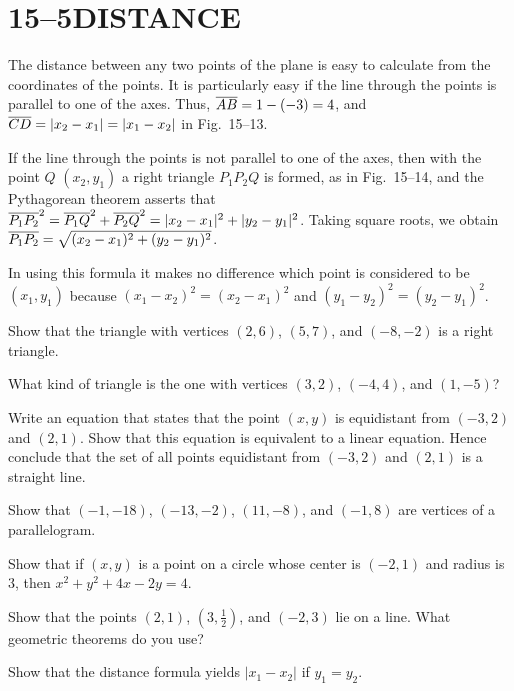 \documentclass[11pt]{book}
\theoremstyle{bkplain}
\begin{document}
\section*{15--5\quad DISTANCE}

The distance between any two points of the plane is easy to calculate from the
coordinates of the points. It is particularly easy if the line through the
points is parallel to one of the axes. Thus, $\overline{AB} = 1 - (-3) = 4$, and
$\overline{CD} = |x_2 - x_1| = |x_1 - x_2|$ in Fig.~15--13.

\FIGXVTHIRTEENFOURTEEN

If the line through the points is not parallel to one of the axes, then with
the point $Q$ $(x_2, y_1)$ a right triangle $P_1P_2Q$ is formed, as in
Fig.~15--14, and the Pythagorean theorem asserts that
$\overline{P_1P_2}^2 = \overline{P_1Q}^2 + \overline{P_2Q}^2 = |x_2 - x_1|^2 +
|y_2 - y_1|^2$. Taking square roots, we obtain
$\overline{P_1P_2} = \sqrt{(x_2-x_1)^2 + (y_2-y_1)^2}$.

\begin{remark}
In using this formula it makes no difference which point is considered to be
$(x_1, y_1)$ because $(x_1 - x_2)^2 = (x_2 - x_1)^2$ and
$(y_1 - y_2)^2 = (y_2 - y_1)^2$.
\end{remark}

\begin{exercisecols}
\begin{exlist}
\item Show that the triangle with vertices $(2, 6)$, $(5, 7)$, and
  $(-8, -2)$ is a right triangle.
\item What kind of triangle is the one with vertices $(3, 2)$, $(-4, 4)$, and
  $(1, -5)$?
\item[\stex 3.] Write an equation that states that the point $(x, y)$ is
  equidistant from $(-3, 2)$ and $(2, 1)$. Show that this equation is
  equivalent to a linear equation. Hence conclude that the set of all points
  equidistant from $(-3, 2)$ and $(2, 1)$ is a straight line.
\item[4.] Show that $(-1, -18)$, $(-13, -2)$, $(11, -8)$, and $(-1, 8)$ are
  vertices of a parallelogram.
\setcounter{exlisti}{4}
\item Show that if $(x, y)$ is a point on a circle whose center is $(-2, 1)$
  and radius is 3, then $x^2 + y^2 + 4x - 2y = 4$.
\item Show that the points $(2, 1)$, $(3, \tfrac{1}{2})$, and $(-2, 3)$ lie on
  a line. What geometric theorems do you use?
\item Show that the distance formula yields $|x_1 - x_2|$ if $y_1 = y_2$.
\end{exlist}
\end{exercisecols}
\end{document}
